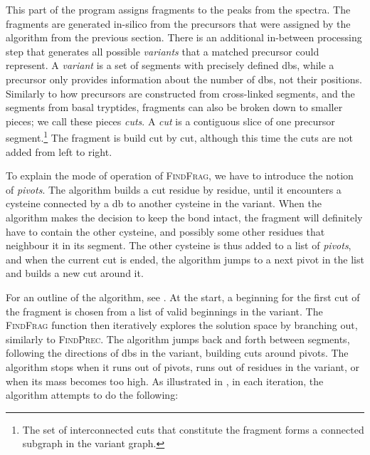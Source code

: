 This part of the program assigns fragments to the peaks from the spectra. The fragments are generated in-silico from the precursors that were assigned by the algorithm from the previous section. There is an additional in-between processing step that generates all possible \emph{variants} that a matched precursor could represent. A \emph{variant} is a set of segments with precisely defined \glspl*{db}, while a precursor only provides information about the number of \glspl*{db}, not their positions. Similarly to how precursors are constructed from cross-linked segments, and the segments from basal tryptides, fragments can also be broken down to smaller pieces; we call these pieces \emph{cuts}. A \emph{cut} is a contiguous slice of one precursor segment.\footnote{The set of interconnected cuts that constitute the fragment forms a connected subgraph in the variant graph.} The fragment is build cut by cut, although this time the cuts are not added from left to right.

To explain the mode of operation of \textsc{FindFrag}, we have to introduce the notion of \emph{pivots}. The algorithm builds a cut residue by residue, until it encounters a cysteine connected by a \gls*{db} to another cysteine in the variant. When the algorithm makes the decision to keep the bond intact, the fragment will definitely have to contain the other cysteine, and possibly some other residues that neighbour it in its segment. The other cysteine is thus added to a list of \emph{pivots}, and when the current cut is ended, the algorithm jumps to a next pivot in the list and builds a new cut around it.

For an outline of the algorithm, see . At the start, a beginning for the first cut of the fragment is chosen from a list of valid beginnings in the variant. The \textsc{FindFrag} function then iteratively explores the solution space by branching out, similarly to \textsc{FindPrec}. The algorithm jumps back and forth between segments, following the directions of \glspl*{db} in the variant, building cuts around pivots. The algorithm stops when it runs out of pivots, runs out of residues in the variant, or when its mass becomes too high. As illustrated in , in each iteration, the algorithm attempts to do the following:

